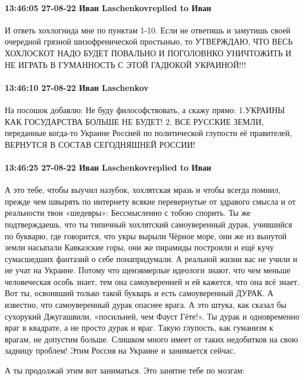 \paragraph{13:46:05 27-08-22 Иван Laschenkovreplied to Иван}

И ответь хохлогнида мне по пунктам 1-10. Если не ответишь и замутишь своей очередной грязной шизофренической простынью, то УТВЕРЖДАЮ, ЧТО ВЕСЬ ХОХЛОСКОТ НАДО БУДЕТ ПОВАЛЬНО И ПОГОЛОВНКО УНИЧТОЖИТЬ И НЕ ИГРАТЬ В ГУМАННОСТЬ С ЭТОЙ ГАДЮКОЙ УКРАИНОЙ!!!

\paragraph{13:46:10 27-08-22 Иван Laschenkov}
На посошок добавлю:
Не буду философствовать, а скажу прямо:
1.УКРАИНЫ КАК ГОСУДАРСТВА БОЛЬШЕ НЕ БУДЕТ!
2. ВСЕ РУССКИЕ ЗЕМЛИ, переданные когда-то Украине Россией по политической глупости её правителей,
ВЕРНУТСЯ В СОСТАВ СЕГОДНЯШНЕЙ РОССИИ!

\paragraph{13:46:25 27-08-22 Иван Laschenkovreplied to Иван}

А это тебе, чтобы выучил назубок, хохлятская мразь и чтобы всегда помнил,
прежде чем швырять по интернету всякие перевернутые от здравого смысла и от
реальности твои «шедевры»: Бессмысленно с тобою спорить. Ты же подтверждаешь,
что ты типичный хохлятский самоуверенный дурак, учившийся по букварю, где
говорится, что укры вырыли Чёрное море, они же из вынутой земли насыпали
Кавказские горы, они же пирамиды построили и ещё кучу сумасшедших фантазий о
себе понапридумали. А реальной жизни вас не учили и не учат на Украине. Потому
что щенэвмерлые идеологи знают, что чем меньше человеческая особь знает, тем
она самоуверенней и ей кажется, что она всё знает. Вот ты, освоивший только
такой букварь и есть самоуверенный ДУРАК. А известно, что самоуверенный дурак
опаснее врага. А это штука, как сказал бы сухорукий Джугашвили, «посильней, чем
Фауст Гёте!». Ты дурак и одновременно враг в квадрате, а не просто дурак и
враг. Такую глупость, как гуманизм к врагам, не допустим больше. Слишком много
имеет от таких недобитков на свою задницу проблем! Этим Россия на Украине и
занимается сейчас.

А ты продолжай этим вот заниматься. Это занятие тебе по мозгам:


